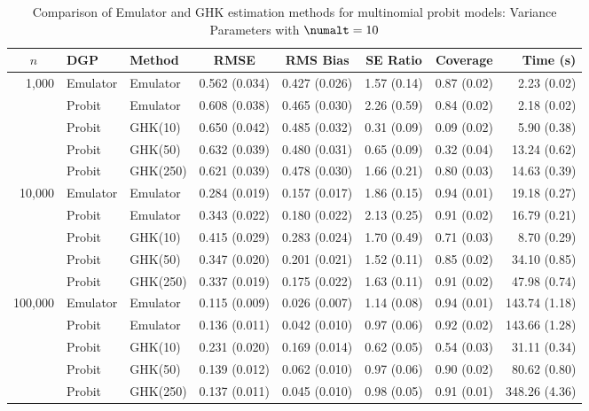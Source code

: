 \begin{table}[htbp]
\centering
\footnotesize
\begin{tabular}{@{}rllrrrrr@{}}
\toprule
\multicolumn{1}{c}{$n$} & \multicolumn{1}{l}{DGP} & \multicolumn{1}{l}{Method} & \multicolumn{1}{c}{RMSE} & \multicolumn{1}{c}{RMS Bias} & \multicolumn{1}{c}{SE Ratio} & \multicolumn{1}{c}{Coverage} & \multicolumn{1}{r}{Time (s)} \\
\midrule
\multirow{5}{*}{1,000} & Emulator & Emulator & 0.562 (0.034) & 0.427 (0.026) & 1.57 (0.14) & 0.87 (0.02) & 2.23 (0.02) \\
 & Probit & Emulator & 0.608 (0.038) & 0.465 (0.030) & 2.26 (0.59) & 0.84 (0.02) & 2.18 (0.02) \\
 & Probit & GHK(10) & 0.650 (0.042) & 0.485 (0.032) & 0.31 (0.09) & 0.09 (0.02) & 5.90 (0.38) \\
 & Probit & GHK(50) & 0.632 (0.039) & 0.480 (0.031) & 0.65 (0.09) & 0.32 (0.04) & 13.24 (0.62) \\
 & Probit & GHK(250) & 0.621 (0.039) & 0.478 (0.030) & 1.66 (0.21) & 0.80 (0.03) & 14.63 (0.39) \\
\midrule
\multirow{5}{*}{10,000} & Emulator & Emulator & 0.284 (0.019) & 0.157 (0.017) & 1.86 (0.15) & 0.94 (0.01) & 19.18 (0.27) \\
 & Probit & Emulator & 0.343 (0.022) & 0.180 (0.022) & 2.13 (0.25) & 0.91 (0.02) & 16.79 (0.21) \\
 & Probit & GHK(10) & 0.415 (0.029) & 0.283 (0.024) & 1.70 (0.49) & 0.71 (0.03) & 8.70 (0.29) \\
 & Probit & GHK(50) & 0.347 (0.020) & 0.201 (0.021) & 1.52 (0.11) & 0.85 (0.02) & 34.10 (0.85) \\
 & Probit & GHK(250) & 0.337 (0.019) & 0.175 (0.022) & 1.63 (0.11) & 0.91 (0.02) & 47.98 (0.74) \\
\midrule
\multirow{5}{*}{100,000} & Emulator & Emulator & 0.115 (0.009) & 0.026 (0.007) & 1.14 (0.08) & 0.94 (0.01) & 143.74 (1.18) \\
 & Probit & Emulator & 0.136 (0.011) & 0.042 (0.010) & 0.97 (0.06) & 0.92 (0.02) & 143.66 (1.28) \\
 & Probit & GHK(10) & 0.231 (0.020) & 0.169 (0.014) & 0.62 (0.05) & 0.54 (0.03) & 31.11 (0.34) \\
 & Probit & GHK(50) & 0.139 (0.012) & 0.062 (0.010) & 0.97 (0.06) & 0.90 (0.02) & 80.62 (0.80) \\
 & Probit & GHK(250) & 0.137 (0.011) & 0.045 (0.010) & 0.98 (0.05) & 0.91 (0.01) & 348.26 (4.36) \\
\bottomrule
\end{tabular}
\caption{Comparison of Emulator and GHK estimation methods for multinomial probit models: Variance Parameters with $\numalt=10$}
\label{tab:emulator_vs_ghk:10:variance}
\end{table}